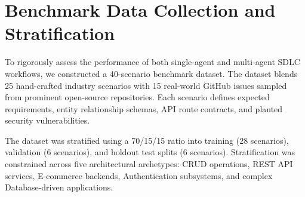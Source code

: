 \section{Benchmark Data Collection and Stratification}
To rigorously assess the performance of both single-agent and multi-agent SDLC workflows, we constructed a 40-scenario benchmark dataset. The dataset blends 25 hand-crafted industry scenarios with 15 real-world GitHub issues sampled from prominent open-source repositories. Each scenario defines expected requirements, entity relationship schemas, API route contracts, and planted security vulnerabilities.

The dataset was stratified using a 70/15/15 ratio into training (28 scenarios), validation (6 scenarios), and holdout test splits (6 scenarios). Stratification was constrained across five architectural archetypes: CRUD operations, REST API services, E-commerce backends, Authentication subsystems, and complex Database-driven applications.
